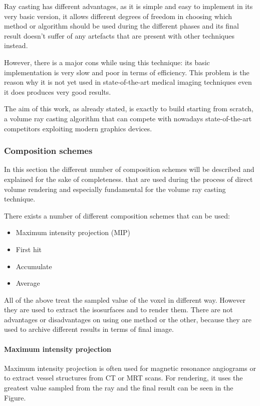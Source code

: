 \documentclass[12pt,a4paper]{extarticle}
\newcommand{\linespace}{\vspace{8pt}}
\begin{document}
Ray casting has different advantages, as it is simple and easy to implement in its very basic version, it allows different degrees of freedom in choosing which method or algorithm should be used during the different phases and its final result doesn't suffer of any artefacts that are present with other techniques instead.

However, there is a major cons while using this technique: its basic implementation is very slow and poor in terms of efficiency. This problem is the reason why it is not yet used in state-of-the-art medical imaging techniques even  it does produces very good results.
\linespace

The aim of this work, as already stated, is exactly to build starting from scratch, a volume ray casting algorithm that can compete with nowadays state-of-the-art competitors exploiting modern graphics devices.

\subsubsection{Composition schemes}
In this section the different number of composition schemes will be described and explained for the sake of completeness. that are used during the process of direct volume rendering and especially fundamental for the volume ray casting technique.

There exists a number of different composition schemes that can be used:
\begin{itemize}
\item Maximum intensity projection (MIP)
\item First hit
\item Accumulate
\item Average
\end{itemize}  
All of the above treat the sampled value of the voxel in different way. However they are used to extract the isosurfaces and to render them. There are not advantages or disadvantages on using one method or the other, because they are used to archive different results in terms of final image.
\paragraph{Maximum intensity projection} Maximum intensity projection is often used for magnetic resonance angiograms or to extract vessel structures from CT or MRT scans. For rendering, it uses the greatest value sampled from the ray and the final result can be seen in the Figure. 
\end{document}
